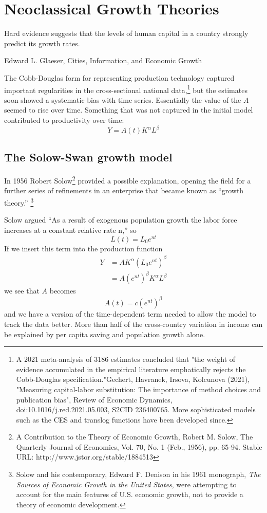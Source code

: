 \chapter{Neoclassical Growth Theories} \label{chapter-growth}
\epigraph{Hard evidence suggests that the levels of human capital in a country strongly predict its growth rates.}{Edward L. Glaeser, Cities, Information, and Economic Growth}

The Cobb-Douglas form for representing production technology captured  important regularities in the cross-sectional national data,\footnote{ A 2021 meta-analysis of 3186 estimates concluded that "the weight of evidence accumulated in the empirical literature emphatically rejects the Cobb-Douglas specification."Gechert, Havranek, Irsova, Kolcunova (2021), "Measuring capital-labor substitution: The importance of method choices and publication bias", Review of Economic Dynamics, doi:10.1016/j.red.2021.05.003, S2CID 236400765. More sophisticated models  such as the CES and translog functions have been developed  since.} 
but the estimates soon showed a systematic bias with time series. Essentially the value of the $A$ seemed to rise over time. Something that was not captured in the initial model  contributed to productivity over time: 
 \[Y=A(t)K^\alpha L^\beta\]


 \section{The Solow-Swan growth model}
In 1956 Robert Solow\footnote{A Contribution to the Theory of Economic Growth,  Robert M. Solow, The Quarterly Journal of Economics, Vol. 70, No. 1 (Feb., 1956), pp. 65-94. Stable URL: http://www.jstor.org/stable/1884513} provided a possible explanation, opening the field for a further series of refinements in an enterprise that became known as ``growth theory.''
\footnote{Solow and his contemporary, Edward F. Denison in his 1961 monograph, \textit{The Sources of Economic Growth in the United States}, were attempting to account for the main features of U.S. economic growth, not to provide a theory of economic development.}%

Solow argued ``As a result of exogenous population growth the labor force increases at a constant relative rate n,'' so
  \[L(t)= L_0e^{nt}\] 
If we insert this term into the production function 
\begin{eqnarray}
Y &= AK^\alpha (L_0e^{nt})^\beta\nonumber\\
  &= A(e^{nt})^{\beta}K^\alpha L^\beta
\label{eqn-solow-swan3}
\end{eqnarray}
we see that $A$ becomes
 \[A(t)=c(e^{nt})^\beta\]
and we have a version of the time-dependent term needed to  allow the model to track the data better. More than half  of the cross-country variation in income can be explained by per capita saving and population growth alone.




